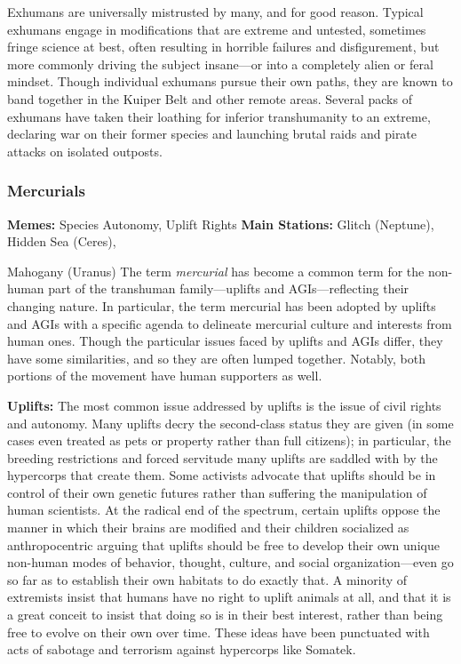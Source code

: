 Exhumans are universally mistrusted by many, and 
for good reason. Typical exhumans engage in modifications
that are extreme and untested, sometimes
fringe science at best, often resulting in horrible failures
and disfigurement, but more commonly driving
the subject insane—or into a completely alien or feral 
mindset. Though individual exhumans pursue their 
own paths, they are known to band together in the 
Kuiper Belt and other remote areas. Several packs 
of exhumans have taken their loathing for inferior 
transhumanity to an extreme, declaring war on their 
former species and launching brutal raids and pirate 
attacks on isolated outposts.

\subsubsection{Mercurials}

\textbf{Memes:} Species Autonomy, Uplift Rights
\textbf{Main Stations:} Glitch (Neptune), Hidden Sea (Ceres), 

Mahogany (Uranus)
The term \textit{mercurial} has become a common term for 
the non-human part of the transhuman family—uplifts
and AGIs—reflecting their changing nature. In
particular, the term mercurial has been adopted by 
uplifts and AGIs with a specific agenda to delineate 
mercurial culture and interests from human ones. 
Though the particular issues faced by uplifts and 
AGIs differ, they have some similarities, and so they 
are often lumped together. Notably, both portions of 
the movement have human supporters as well.

\textbf{Uplifts: }The most common issue addressed by uplifts 
is the issue of civil rights and autonomy. Many uplifts 
decry the second-class status they are given (in some 
cases even treated as pets or property rather than full 
citizens); in particular, the breeding restrictions and 
forced servitude many uplifts are saddled with by the 
hypercorps that create them. Some activists advocate 
that uplifts should be in control of their own genetic futures
rather than suffering the manipulation of human
scientists. At the radical end of the spectrum, certain 
uplifts oppose the manner in which their brains are 
modified and their children socialized as anthropocentric
arguing that uplifts should be free to develop their
own unique non-human modes of behavior, thought, 
culture, and social organization—even go so far as 
to establish their own habitats to do exactly that. A 
minority of extremists insist that humans have no right 
to uplift animals at all, and that it is a great conceit 
to insist that doing so is in their best interest, rather 
than being free to evolve on their own over time. These 
ideas have been punctuated with acts of sabotage and 
terrorism against hypercorps like Somatek.

